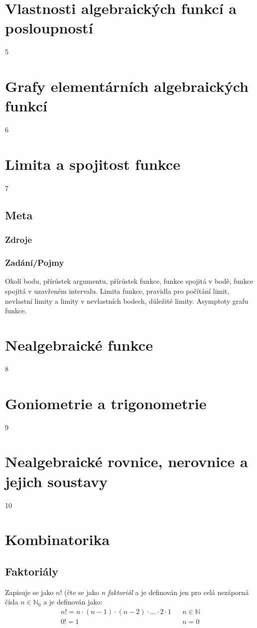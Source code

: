 \documentclass[12pt]{article}
\begin{document}
\section{Vlastnosti algebraických funkcí a posloupností}
5

\section{Grafy elementárních algebraických funkcí}
6

\section{Limita a spojitost funkce}
7
\subsection{Meta}
\subsubsection{Zdroje}
\subsubsection{Zadání/Pojmy}
Okolí bodu, přírůstek argumentu, přírůstek funkce, funkce spojitá v bodě, funkce spojitá v uzavřeném intervalu. Limita funkce, pravidla pro počítání limit, nevlastní limity a limity v nevlastních bodech, důležité limity. Asymptoty grafu funkce.

\section{Nealgebraické funkce}
8

\section{Goniometrie a trigonometrie}
9

\section{Nealgebraické rovnice, nerovnice a jejich soustavy}
10

\section{Kombinatorika}
\subsection{Faktoriály}
Zapisuje se jako $n!$ (čte se jako \emph{n faktoriál} a je definován jen pro celá nezáporná čísla $n \in \mathbb{N}_0$ a je definován jako:
\begin{align}
n! = n \cdot (n-1) \cdot (n-2) \cdot \dots \cdot 2 \cdot 1 && n \in \mathbb{N}\\
0! = 1 && n=0
\end{align}
\end{document}
